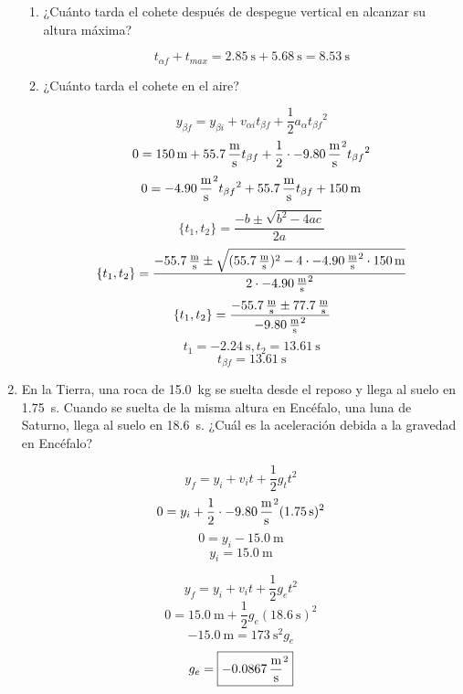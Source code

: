 \documentclass[Análisis.root.tex]{subfiles}
\begin{document}
\begin{enumerate}
\begin{enumerate}
          \item ¿Cuánto tarda el cohete después de despegue vertical en alcanzar su altura máxima?

                \[t_{\alpha f}+t_{max}=\SI{2.85}{\second}+\SI{5,68}{\second}=\boxed{\SI{8,53}{\second}}\]

                \newpage

          \item ¿Cuánto tarda el cohete en el aire?

                \[y_{\beta f}=y_{\beta i}+v_{\alpha i}t_{\beta f}+\frac{1}{2}a_\alpha{t_{\beta f}}^2\]
                \[0=\SI{150}{\meter}+\SI{55,7}{\meter\over\second}t_{\beta f}+\frac{1}{2}\cdot\SI{-9,80}{\meter\over\second\squared}{t_{\beta f}}^2\]
                \[0=\SI{-4,90}{\meter\over\second\squared}{t_{\beta f}}^2+\SI{55,7}{\meter\over\second}t_{\beta f}+\SI{150}{\meter}\]
                \[\{t_1,t_2\}=\frac{-b\pm\sqrt{b^2-4ac}}{2a}\]
                \[\{t_1,t_2\}=\frac{\SI{-55,7}{\meter\over\second}\pm\sqrt{(\SI{55,7}{\meter\over\second})^2-4\cdot\SI{-4,90}{\meter\over\second\squared}\cdot\SI{150}{\meter}}}{2\cdot\SI{-4,90}{\meter\over\second\squared}}\]
                \[\{t_1,t_2\}=\frac{\SI{-55,7}{\meter\over\second}\pm\SI{77,7}{\meter\over\second}}{\SI{-9,80}{\meter\over\second\squared}}\]
                \[t_1=\SI{-2,24}{\second},t_2=\SI{13,61}{\second}\]
                \[t_{\beta f}=\boxed{\SI{13,61}{\second}}\]
        \end{enumerate}

  \item En la Tierra, una roca de \SI{15,0}{\kilogram} se suelta desde el reposo y llega al suelo en \SI{1,75}{\second}. Cuando se suelta de la misma altura en Encéfalo, una luna de Saturno, llega al suelo en \SI{18,6}{\second}. ¿Cuál es la aceleración debida a la gravedad en Encéfalo?

        \[y_f=y_i+v_it+\frac{1}{2}g_tt^2\]
        \[0=y_i+\frac{1}{2}\cdot\SI{-9,80}{\meter\over\second\squared}(\SI{1,75}{\second})^2\]
        \[0=y_i-\SI{15,0}{\meter}\]
        \[y_i=\SI{15,0}{\meter}\]

        \[y_f=y_i+v_it+\frac{1}{2}g_et^2\]
        \[0=\SI{15,0}{\meter}+\frac{1}{2}g_e(\SI{18,6}{\second})^2\]
        \[\SI{-15,0}{\meter}=\SI{173}{\second\squared}g_e\]
        \[g_e=\boxed{\SI{-0,0867}{\meter\over\second\squared}}\]
\end{enumerate}
\end{document}
